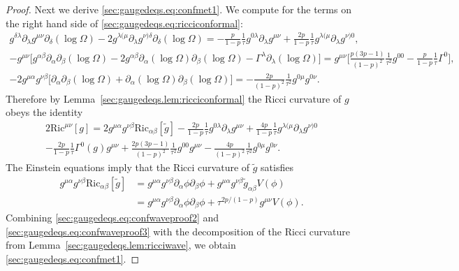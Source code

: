 \documentclass{article}
\newcommand{\Ric}{\mathrm{Ric}}
\newcommand{\wt}{\widetilde}
\newcommand{\pa}{\partial}
\begin{document}
\begin{proof}
    Next we derive \eqref{sec:gaugedeqs.eq:confmet1}. We compute for the terms on the right hand side of \eqref{sec:gaugedeqs.eq:ricciconformal}:
    \begin{subequations}
        \begin{gather}
            g^{\delta\lambda}\pa_\lambda g^{\mu\nu} \pa_\delta (\log \Omega) - 2g^{\lambda(\mu}\pa_\lambda g^{\nu)\delta}\pa_\delta (\log \Omega) = -\frac{p}{1-p}\frac{1}{\tau}g^{0\lambda}\pa_\lambda g^{\mu\nu} + \frac{2p}{1-p}\frac{1}{\tau}g^{\lambda(\mu}\pa_\lambda g^{\nu)0},\\
            - g^{\mu\nu} \Big[g^{\alpha\beta}\pa_\alpha \pa_\beta (\log\Omega) - 2g^{\alpha\beta}\pa_\alpha (\log \Omega) \pa_\beta (\log \Omega) - \Gamma^\lambda \pa_\lambda (\log \Omega)\Big] = g^{\mu\nu}\Big[\frac{p(3p-1)}{(1-p)^2}\frac{1}{\tau^2}g^{00} - \frac{p}{1-p}\frac{1}{\tau}\Gamma^0 \Big],\\
            -2g^{\mu\alpha}g^{\nu\beta}\Big[\pa_\alpha\pa_\beta(\log \Omega) + \pa_\alpha (\log \Omega)\pa_\beta (\log \Omega)\Big] = -\frac{2p}{(1-p)^2}\frac{1}{\tau^2}g^{0\mu}g^{0\nu}.
        \end{gather}
    \end{subequations}
    Therefore by Lemma~\ref{sec:gaugedeqs.lem:ricciconformal} the Ricci curvature of $g$ obeys the identity
    \begin{multline}
        2\Ric^{\mu\nu}[g] = 2g^{\mu\alpha}g^{\nu\beta}\Ric_{\alpha\beta}[\wt{g}] -\frac{2p}{1-p}\frac{1}{\tau}g^{0\lambda}\pa_\lambda g^{\mu\nu} + \frac{4p}{1-p}\frac{1}{\tau}g^{\lambda(\mu}\pa_\lambda g^{\nu)0}\\-\frac{2p}{1-p}\frac{1}{\tau}\Gamma^0(g)g^{\mu\nu} +  \frac{2p(3p-1)}{(1-p)^2}\frac{1}{\tau^2}g^{00}g^{\mu\nu} - \frac{4p}{(1-p)^2}\frac{1}{\tau^2}g^{0\mu}g^{0\nu}.\label{sec:gaugedeqs.eq:confwaveproof2}
    \end{multline}
    The Einstein equations imply that the Ricci curvature of $\wt{g}$ satisfies
    \begin{align}
        g^{\mu\alpha}g^{\nu\beta}\Ric_{\alpha\beta}[\wt{g}] &= g^{\mu\alpha}g^{\nu\beta}\pa_\alpha\phi\pa_\beta\phi + g^{\mu\alpha}g^{\nu\beta}\wt{g}_{\alpha\beta}V(\phi)\nonumber\\
        &= g^{\mu\alpha}g^{\nu\beta}\pa_\alpha\phi\pa_\beta\phi + \tau^{2p/(1-p)}g^{\mu\nu}V(\phi).\label{sec:gaugedeqs.eq:confwaveproof3}
    \end{align}
    Combining \eqref{sec:gaugedeqs.eq:confwaveproof2} and \eqref{sec:gaugedeqs.eq:confwaveproof3} with the decomposition of the Ricci curvature from Lemma~\ref{sec:gaugedeqs.lem:ricciwave}, we obtain \eqref{sec:gaugedeqs.eq:confmet1}.
\end{proof}
\end{document}
